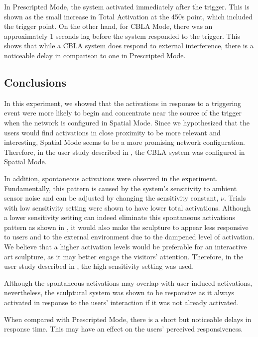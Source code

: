 In Prescripted Mode, the system activated immediately after the trigger. This is shown as the small increase in Total Activation at the 450s point, which included the trigger point. On the other hand, for CBLA Mode, there was an approximately 1 seconds lag before the system responded to the trigger. This shows that while a CBLA system does respond to external interference, there is a noticeable delay in comparison to one in Prescripted Mode. 


\subsection{Conclusions}

In this experiment, we showed that the activations in response to a triggering event were more likely to begin and concentrate near the source of the trigger when the network is configured in Spatial Mode. Since we hypothesized that the users would find activations in close proximity to be more relevant and interesting, Spatial Mode seems to be a more promising network configuration. Therefore, in the user study described in , the CBLA system was configured in Spatial Mode. 

In addition, spontaneous activations were observed in the experiment. Fundamentally, this pattern is caused by the system's sensitivity to ambient sensor noise and can be adjusted by changing the sensitivity constant, $\nu$. Trials with low sensitivity setting were shown to have lower total activations. Although a lower sensitivity setting can indeed eliminate this spontaneous activations pattern as shown in , it would also make the sculpture to appear less responsive to users and to the external environment due to the dampened level of activation. We believe that a higher activation levels would be preferable for an interactive art sculpture, as it may better engage the visitors' attention. Therefore, in the user study described in , the high sensitivity setting was used.

Although the spontaneous activations may overlap with user-induced activations, nevertheless, the sculptural system was shown to be responsive as it always activated in response to the users' interaction if it was not already activated.

When compared with Prescripted Mode, there is a short but noticeable delays in response time. This may have an effect on the users' perceived responsiveness.

